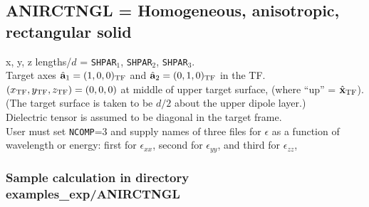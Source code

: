 \subsection{ ANIRCTNGL = Homogeneous, anisotropic, rectangular solid
            \label{sec:ANIRCTNGL}}
	x, y, z lengths/$d$ = {\tt SHPAR$_1$}, {\tt SHPAR$_2$}, 
        {\tt SHPAR}$_3$.\\
	Target axes ${\hat{\bf a}}_1=(1,0,0)_{\rm TF}$ 
	and ${\hat{\bf a}}_2=(0,1,0)_{\rm TF}$ 
	in the TF. \\
        $(x_{\rm TF},y_{\rm TF},z_{\rm TF})=(0,0,0)$ at middle of upper target surface,
	(where ``up'' = $\hat{\bf x}_{\rm TF}$).  (The target surface is taken to be $d/2$
	about the upper dipole layer.)\\
	Dielectric tensor is assumed to be diagonal in the target frame.\\
	User must set {\tt NCOMP}=3 and
	supply names of three files for $\epsilon$ as a function
	of wavelength or energy: first for $\epsilon_{xx}$,
	second for $\epsilon_{yy}$, and third for $\epsilon_{zz}$,

\subsubsection{\bf Sample calculation in directory examples\_exp/ANIRCTNGL}

